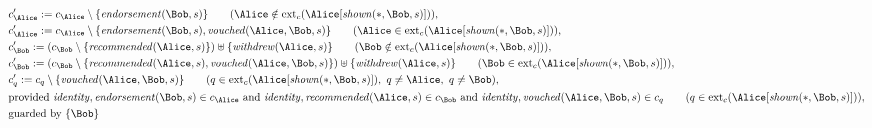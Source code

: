\begin{align*}
&
c'_
{
\Alice
}
 := 
c_
{
\Alice
}
 \setminus 
\{
\mathit{
endorsement
}
(
\Bob
,
s
)
\}
 \qquad (
\Alice
 \notin 
\mathrm{ext}_c(
\Alice
[
\mathit{
shown
}
(
\ast
,
\Bob
,
s
)
]
)
)
,\\
&
c'_
{
\Alice
}
 := 
c_
{
\Alice
}
 \setminus 
\{
\mathit{
endorsement
}
(
\Bob
,
s
)
,
\mathit{
vouched
}
(
\Alice
,
\Bob
,
s
)
\}
 \qquad (
\Alice
 \in 
\mathrm{ext}_c(
\Alice
[
\mathit{
shown
}
(
\ast
,
\Bob
,
s
)
]
)
)
,\\
&
c'_
{
\Bob
}
 := 
(c_
{
\Bob
}
 \setminus 
\{
\mathit{
recommended
}
(
\Alice
,
s
)
\}
) \uplus 
\{
\mathit{
withdrew
}
(
\Alice
,
s
)
\}
 \qquad (
\Bob
 \notin 
\mathrm{ext}_c(
\Alice
[
\mathit{
shown
}
(
\ast
,
\Bob
,
s
)
]
)
)
,\\
&
c'_
{
\Bob
}
 := 
(c_
{
\Bob
}
 \setminus 
\{
\mathit{
recommended
}
(
\Alice
,
s
)
,
\mathit{
vouched
}
(
\Alice
,
\Bob
,
s
)
\}
) \uplus 
\{
\mathit{
withdrew
}
(
\Alice
,
s
)
\}
 \qquad (
\Bob
 \in 
\mathrm{ext}_c(
\Alice
[
\mathit{
shown
}
(
\ast
,
\Bob
,
s
)
]
)
)
,\\
&
c'_
q
 := 
c_
q
 \setminus 
\{
\mathit{
vouched
}
(
\Alice
,
\Bob
,
s
)
\}
 \qquad (
q
 \in 
\mathrm{ext}_c(
\Alice
[
\mathit{
shown
}
(
\ast
,
\Bob
,
s
)
]
)
,\ 
q \neq 
\Alice
,\ 
q \neq 
\Bob
)
,\\
&
\text{provided } 
\mathit{
identity
}
,
\mathit{
endorsement
}
(
\Bob
,
s
)
 \in c_
{
\Alice
}
 \text{ and } 
\mathit{
identity
}
,
\mathit{
recommended
}
(
\Alice
,
s
)
 \in c_
{
\Bob
}
 \text{ and } 
\mathit{
identity
}
,
\mathit{
vouched
}
(
\Alice
,
\Bob
,
s
)
 \in c_
q
 \qquad (
q \in 
\mathrm{ext}_c(
\Alice
[
\mathit{
shown
}
(
\ast
,
\Bob
,
s
)
]
)
)
,\\
&
\text{guarded by } \{
\Bob
\}
\end{align*}
